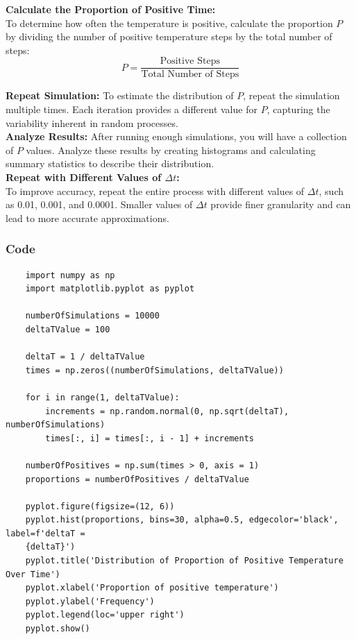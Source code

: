 \documentclass{article}
\begin{document}
\textbf{Calculate the Proportion of Positive Time:} \\
To determine how often the temperature is positive, calculate the proportion \(P\) by dividing the number of positive temperature steps by the total number of steps:
\[
P = \frac{\text{Positive Steps}}{\text{Total Number of Steps}}
\]

\textbf{Repeat Simulation:}
To estimate the distribution of \(P\), repeat the simulation multiple times. Each iteration provides a different value for \(P\), capturing the variability inherent in random processes.\\

\textbf{Analyze Results:}
After running enough simulations, you will have a collection of \(P\) values. Analyze these results by creating histograms and calculating summary statistics to describe their distribution.\\

\textbf{Repeat with Different Values of \(\Delta t\):} \\
To improve accuracy, repeat the entire process with different values of \(\Delta t\), such as 0.01, 0.001, and 0.0001. Smaller values of \(\Delta t\) provide finer granularity and can lead to more accurate approximations.

\subsubsection*{Code}

\begin{verbatim}
    import numpy as np
    import matplotlib.pyplot as pyplot
    
    numberOfSimulations = 10000
    deltaTValue = 100
    
    deltaT = 1 / deltaTValue                                                            
    times = np.zeros((numberOfSimulations, deltaTValue))                                          
    
    for i in range(1, deltaTValue):                                                     
        increments = np.random.normal(0, np.sqrt(deltaT), numberOfSimulations)          
        times[:, i] = times[:, i - 1] + increments
    
    numberOfPositives = np.sum(times > 0, axis = 1)
    proportions = numberOfPositives / deltaTValue
    
    pyplot.figure(figsize=(12, 6))
    pyplot.hist(proportions, bins=30, alpha=0.5, edgecolor='black', label=f'deltaT = 
    {deltaT}')
    pyplot.title('Distribution of Proportion of Positive Temperature Over Time')
    pyplot.xlabel('Proportion of positive temperature')
    pyplot.ylabel('Frequency')
    pyplot.legend(loc='upper right')
    pyplot.show()
\end{verbatim}
\end{document}
